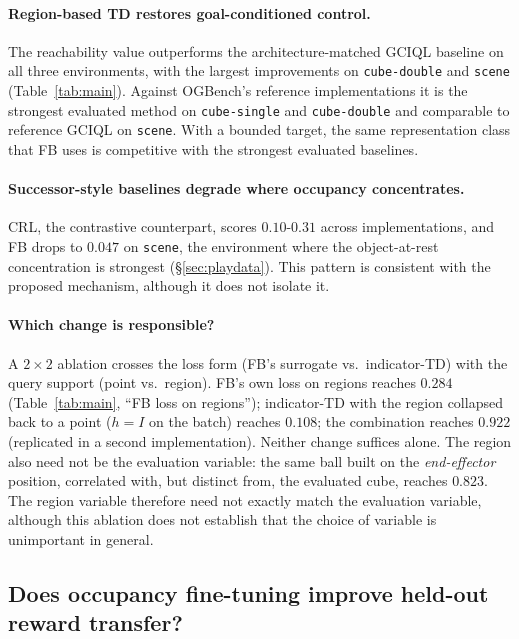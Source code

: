 \documentclass{article}
\begin{document}
\paragraph{Region-based TD restores goal-conditioned control.}
The reachability value outperforms the architecture-matched GCIQL baseline on all three environments, with the largest improvements on \texttt{cube-double} and \texttt{scene} (Table~\ref{tab:main}).
Against OGBench's reference implementations it is the strongest evaluated method on \texttt{cube-single} and \texttt{cube-double} and comparable to reference GCIQL on \texttt{scene}.
With a bounded target, the same representation class that FB uses is competitive with the strongest evaluated baselines.

\paragraph{Successor-style baselines degrade where occupancy concentrates.}
CRL, the contrastive counterpart, scores $0.10$-$0.31$ across implementations, and FB drops to $0.047$ on \texttt{scene}, the environment where the object-at-rest concentration is strongest (\S\ref{sec:playdata}).
This pattern is consistent with the proposed mechanism, although it does not isolate it.

\paragraph{Which change is responsible?}
A $2\times2$ ablation crosses the loss form (FB's surrogate vs.\ indicator-TD) with the query support (point vs.\ region).
FB's own loss on regions reaches $0.284$ (Table~\ref{tab:main}, ``FB loss on regions''); indicator-TD with the region collapsed back to a point ($h=I$ on the batch) reaches $0.108$; the combination reaches $0.922$ (replicated in a second implementation).
Neither change suffices alone.
The region also need not be the evaluation variable: the same ball built on the \emph{end-effector} position, correlated with, but distinct from, the evaluated cube, reaches $0.823$.
The region variable therefore need not exactly match the evaluation variable, although this ablation does not establish that the choice of variable is unimportant in general.

\subsection{Does occupancy fine-tuning improve held-out reward transfer?}
\label{sec:rq2}\label{sec:reward-transfer}
\end{document}
